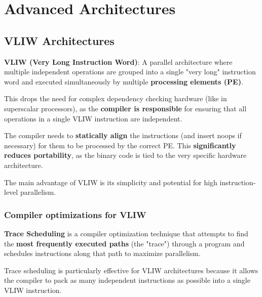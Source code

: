 \section{Advanced Architectures}

\subsection{VLIW Architectures}

\begin{definition}
	\textbf{VLIW (Very Long Instruction Word)}: A parallel architecture where multiple independent operations are grouped into a single "very long" instruction word and executed simultaneously by multiple \textbf{processing elements (PE)}.
\end{definition}

\begin{remark}
	This drops the need for complex dependency checking hardware (like in superscalar processors), as the \textbf{compiler is responsible} for ensuring that all operations in a single VLIW instruction are independent.
\end{remark}

\begin{important}
	The compiler needs to \textbf{statically align} the instructions (and insert noops if necessary) for them to be processed by the correct PE. This \textbf{significantly reduces portability}, as the binary code is tied to the very specific hardware architecture.
\end{important}

\begin{remark}
	The main advantage of VLIW is its simplicity and potential for high instruction-level parallelism.
\end{remark}

\subsubsection{Compiler optimizations for VLIW}

\begin{definition}
	\textbf{Trace Scheduling} is a compiler optimization technique that attempts to find the \textbf{most frequently executed paths} (the "trace") through a program and schedules instructions along that path to maximize parallelism.
\end{definition}

\begin{remark}
	Trace scheduling is particularly effective for VLIW architectures because it allows the compiler to pack as many independent instructions as possible into a single VLIW instruction.
\end{remark}

